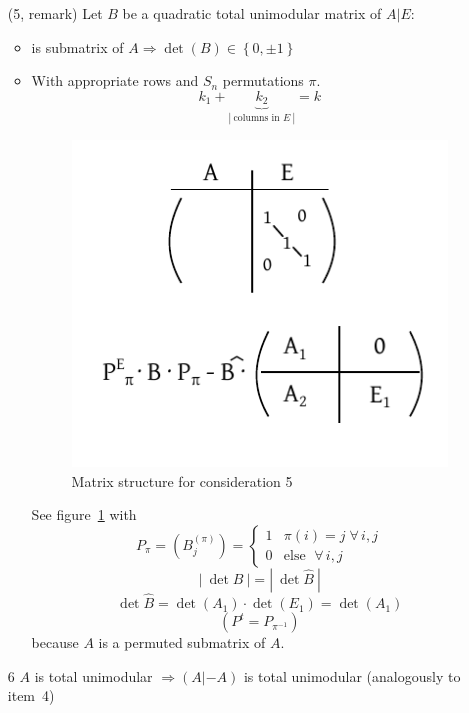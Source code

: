 \documentclass[a4paper]{article}
\theoremstyle{definition}
\newcommand{\card}[1]{\left|\:\!#1\:\!\right|}
\newcommand{\set}[1]{\left\{#1\right\}}
\newcommand{\fall}{\;\forall\,}
\begin{document}
\begin{enumerate}
  \item[(5, remark)]
    Let $B$ be a quadratic total unimodular matrix of $A | E$:
    \begin{itemize}
      \item is submatrix of $A \Rightarrow \det(B) \in \set{0, \pm1}$
      \item
        With appropriate rows and $S_n$ permutations $\pi$.
        \[ k_1 + \underbrace{k_2}_{\card{\text{columns in $E$}}} = k \]
        \begin{figure}[!ht]
          \begin{center}
            \includegraphics{img/tum_second.pdf}
            \caption{Matrix structure for consideration 5}
            \label{fig:consid-5}
          \end{center}
        \end{figure}
        See figure~\ref{fig:consid-5} with \[
          P_\pi = (B_j^{(\pi)}) = \begin{cases}
            1 & \pi(i) = j \fall i,j \\
            0 & \text{else } \fall i,j
          \end{cases}
        \]
        \[ \card{\det{B}} = \card{\det{\hat{B}}} \]
        \[ \det\hat{B} = \det(A_1) \cdot \det(E_1) = \det(A_1) \]
        \[ \left(P^t = P_{\pi^{-1}}\right) \]
        because $A$ is a permuted submatrix of $A$.
    \end{itemize}

  \item[6]
    $A$ is total unimodular $\Rightarrow (A | -A)$ is total unimodular (analogously to item~4)
\end{enumerate}
\end{document}
